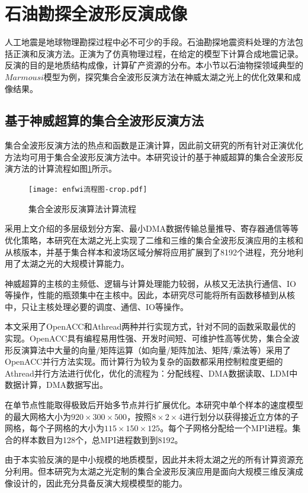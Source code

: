\section{石油勘探全波形反演成像} %

人工地震是地球物理勘探过程中必不可少的手段。石油勘探地震资料处理的方法包括正演和反演方法。正演为了仿真物理过程，在给定的模型下计算合成地震记录。反演的目的是地质结构成像，计算矿产资源的分布。本小节以石油物探领域典型的$Marmousi$模型为例，探究集合全波形反演方法在神威太湖之光上的优化效果和成像结果。

\subsection{基于神威超算的集合全波形反演方法}

集合全波形反演方法的热点和函数是正演计算，因此前文研究的所有针对正演优化方法均可用于集合全波形反演方法中。本研究设计的基于神威超算的集合全波形反演方法的计算流程如图\ref{fig:enfwi-flow}所示。

\begin{figure}[ht]
\centering
\texttt{[image: enfwi流程图-crop.pdf]}
\caption{集合全波形反演算法计算流程}
\label{fig:enfwi-flow}
\end{figure}

采用上文介绍的多层级划分方案、最小DMA数据传输总量推导、寄存器通信等等优化策略，本研究在太湖之光上实现了二维和三维的集合全波形反演应用的主核和从核版本，并基于集合样本和波场区域分解将应用扩展到了8192个进程，充分地利用了太湖之光的大规模计算能力。

神威超算的主核的主频低、逻辑与计算处理能力较弱，从核又无法执行通信、IO等操作，性能的瓶颈集中在主核中。因此，本研究尽可能将所有函数移植到从核中，只让主核处理必要的调度、通信、IO等操作。

本文采用了OpenACC和Athread两种并行实现方式，针对不同的函数采取最优的实现。OpenACC具有编程易用性强、开发时间短、可维护性高等优势，集合全波形反演算法中大量的向量/矩阵运算（如向量/矩阵加法、矩阵/乘法等）采用了OpenACC并行方法实现。而计算行为较为复杂的函数都采用控制粒度更细的Athread并行方法进行优化，优化的流程为：分配线程、DMA数据读取、LDM中数据计算，DMA数据写出。

在单节点性能取得极致后开始多节点并行扩展优化。本研究中单个样本的速度模型的最大网格大小为$920\times 300 \times 500$，按照$8\times 2 \times 4$进行划分以获得接近立方体的子网格，每个子网格的大小为$115\times150\times125$。每个子网格分配给一个MPI进程。集合的样本数目为128个，总MPI进程数到到8192。

由于本实验反演的是中小规模的地质模型，因此并未将太湖之光的所有计算资源充分利用。但本研究为太湖之光定制的集合全波形反演应用是面向大规模三维反演成像设计的，因此充分具备反演大规模模型的能力。

